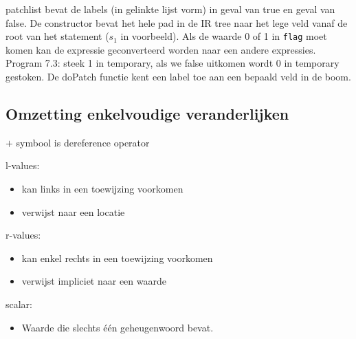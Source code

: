 
patchlist bevat de labels (in gelinkte lijst vorm) in geval van true en geval van false. De constructor bevat het hele pad in de IR tree naar het lege veld vanaf de root van het statement ($s_1$ in voorbeeld). Als de waarde 0 of 1 in \texttt{flag} moet komen kan de expressie geconverteerd worden naar een andere expressies. Program 7.3: steek 1 in temporary, als we false uitkomen wordt 0 in temporary gestoken. De doPatch functie kent een label toe aan een bepaald veld in de boom.

\subsection{Omzetting enkelvoudige veranderlijken}

$+$ symbool is dereference operator


l-values:
\begin{itemize}
	\item kan links in een toewijzing voorkomen
	\item verwijst naar een locatie
\end{itemize}

r-values:
\begin{itemize}
	\item kan enkel rechts in een toewijzing voorkomen
	\item verwijst impliciet naar een waarde
\end{itemize}

scalar:
\begin{itemize}
	\item Waarde die slechts één geheugenwoord bevat.
\end{itemize}



